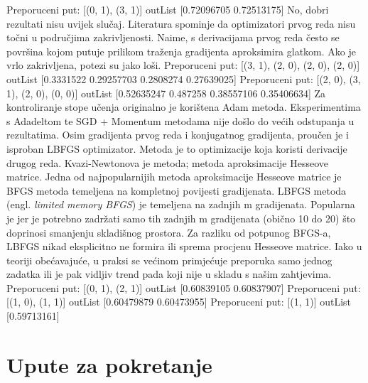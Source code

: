 Preporuceni put: [(0, 1), (3, 1)]\newline
outList [0.72096705 0.72513175]\newline
No, dobri rezultati nisu uvijek slučaj. Literatura spominje da optimizatori prvog reda nisu točni u područjima zakrivljenosti. Naime, s derivacijama prvog reda često se površina kojom putuje prilikom traženja gradijenta aproksimira glatkom. Ako je vrlo zakrivljena, potezi su jako loši.\newline
Preporuceni put: [(3, 1), (2, 0), (2, 0), (2, 0)]\newline
outList [0.3331522  0.29257703 0.2808274  0.27639025] \newline
Preporuceni put: [(2, 0), (3, 1), (2, 0), (0, 0)]\newline
outList [0.52635247 0.487258   0.38557106 0.35406634]\newline
Za kontroliranje stope učenja originalno je korištena Adam metoda. Eksperimentima s Adadeltom te SGD + Momentum metodama nije došlo do većih odstupanja u rezultatima. \newline
Osim gradijenta prvog reda i konjugatnog gradijenta, proučen je i isproban LBFGS optimizator. Metoda je to optimizacije koja koristi derivacije drugog reda. Kvazi-Newtonova je metoda; metoda aproksimacije Hesseove matrice.\newline
Jedna od najpopularnijih metoda aproksimacije Hesseove matrice je BFGS metoda temeljena na kompletnoj povijesti gradijenata. 
LBFGS metoda (engl. \textit{limited memory BFGS}) je temeljena na zadnjih m gradijenata. Popularna je jer je potrebno zadržati samo tih zadnjih m gradijenata (obično 10 do 20) što doprinosi smanjenju skladišnog prostora. Za razliku od potpunog BFGS-a, LBFGS nikad eksplicitno ne formira ili sprema procjenu Hesseove matrice.\newline
Iako u teoriji obećavajuće, u praksi se većinom primjećuje preporuka samo jednog zadatka ili je pak vidljiv trend pada koji nije u skladu s našim zahtjevima.\newline
Preporuceni put: [(0, 1), (2, 1)]\newline
outList [0.60839105 0.60837907]\newline
Preporuceni put: [(1, 0), (1, 1)]\newline
outList [0.60479879 0.60473955]\newline
Preporuceni put: [(1, 1)]\newline
outList [0.59713161]\newline

\section{Upute za pokretanje}

